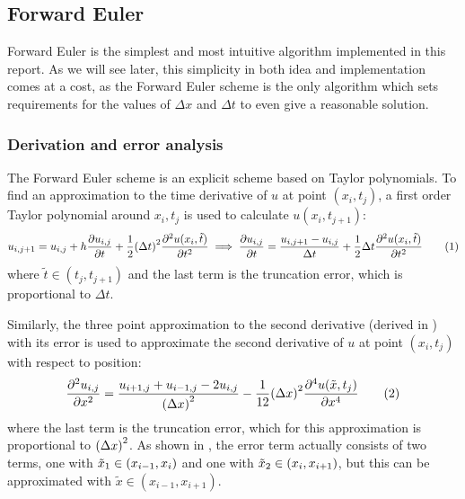 
%
\subsection{Forward Euler}
Forward Euler is the simplest and most intuitive algorithm implemented in this report. As we will see later, this simplicity in both idea and implementation comes at a cost, as the Forward Euler scheme is the only algorithm which sets requirements for the values of \(\Delta x\) and \(\Delta t\) to even give a reasonable solution.


\subsubsection{Derivation and error analysis}\label{sec:ForwardEulerDerivation}
The Forward Euler scheme is an explicit scheme based on Taylor polynomials. To find an approximation to the time derivative of \(u\) at point \((x_i,t_j)\), a first order Taylor polynomial around \(x_i,t_j\) is used to calculate \(u(x_i,t_{j+1})\):
\[
    u_{i,j+1} = u_{i,j} + h\pdv{u_{i,j}}{t} + \frac{1}{2}\qty(\Delta t)^2\pdv[2]{u(x_i,\tilde{t})}{t}
    \implies \pdv{u_{i,j}}{t} = \frac{u_{i,j+1}-u_{i,j}}{\Delta t} + \frac{1}{2}\Delta t\pdv[2]{u(x_i,\tilde{t})}{t}\eqtag{asymmnewton}
\]
where \(\tilde{t}\in(t_j,t_{j+1})\) and the last term is the truncation error, which is proportional to \(\Delta t\).

Similarly, the three point approximation to the second derivative (derived in \autocite{oblig1}) with its error is used to approximate the second derivative of \(u\) at point \((x_i,t_j)\) with respect to position:
\[
    \pdv[2]{u_{i,j}}{x} = \frac{u_{i+1,j} + u_{i-1,j} - 2u_{i,j}}{\qty(\Delta x)^2} - \frac{1}{12}\qty(\Delta x)^2\pdv[4]{u(\tilde{x},t_j)}{x}\eqtag{andrederivert}
\]
where the last term is the truncation error, which for this approximation is proportional to \(\qty(\Delta x)^2\). As shown in \autocite{oblig1}, the error term actually consists of two terms, one with \(\tilde{x}_1\in\qty(x_{i-1},x_i)\) and one with \(\tilde{x}_2\in\qty(x_i,x_{i+1})\), but this can be approximated with \(\tilde{x}\in(x_{i-1},x_{i+1})\).

